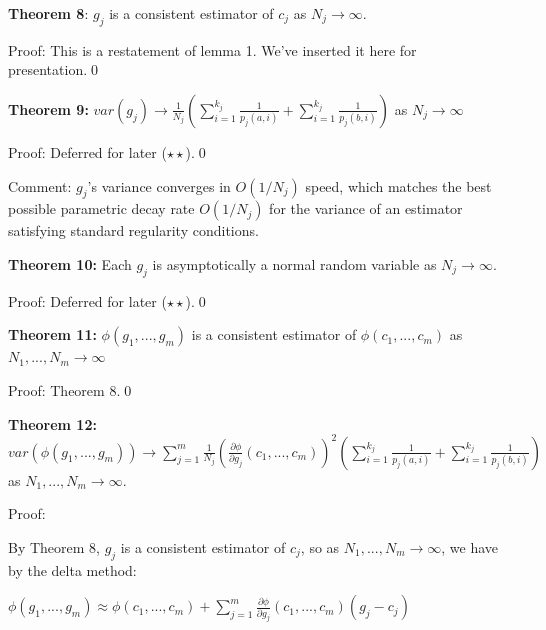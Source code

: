 \documentclass{article}
\begin{document}
\textbf{Theorem 8}: $\displaystyle g_{j}$ is a consistent estimator of $\displaystyle c_{j}$ as $\displaystyle N_{j}\rightarrow \infty $.

Proof: This is a restatement of lemma 1. We've inserted it here for presentation.\qed 



\textbf{Theorem 9:} $\displaystyle var\left( g_{j}\right)\rightarrow \frac{1}{N_{j}}\left(\sum _{i=1}^{k_{j}}\frac{1}{p_{j}\left( a,i\right)} +\sum _{i=1}^{k_{j}}\frac{1}{p_{j}\left( b,i\right)}\right)$ as $\displaystyle N_{j}\rightarrow \infty $

Proof: Deferred for later ($\displaystyle \star \star $).\qed 



Comment: $\displaystyle g_{j}$'s variance converges in $\displaystyle O\left( 1/N_{j}\right)$ speed, which matches the best possible parametric decay rate $\displaystyle O\left( 1/N_{j}\right)$ for the variance of an estimator satisfying standard regularity conditions.



\textbf{Theorem 10:} Each $\displaystyle g_{j}$ is asymptotically a normal random variable as $\displaystyle N_{j}\rightarrow \infty $.



Proof: Deferred for later ($\displaystyle \star \star $).\qed 



\textbf{Theorem 11:} $\displaystyle \phi \left( g_{1} ,...,g_{m}\right)$ is a consistent estimator of $\displaystyle \phi \left( c_{1} ,...,c_{m}\right)$ as $\displaystyle N_{1} ,...,N_{m}\rightarrow \infty $



Proof: Theorem 8.\qed 

\textbf{Theorem 12:} $\displaystyle var\left( \phi \left( g_{1} ,...,g_{m}\right)\right)\rightarrow \sum _{j=1}^{m}\frac{1}{N_{j}}\left(\frac{\partial \phi }{\partial g_{j}}\left( c_{1} ,...,c_{m}\right)\right)^{2}\left(\sum _{i=1}^{k_{j}}\frac{1}{p_{j}\left( a,i\right)} +\sum _{i=1}^{k_{j}}\frac{1}{p_{j}\left( b,i\right)}\right)$ as $\displaystyle N_{1} ,...,N_{m}\rightarrow \infty $.

Proof:

By Theorem 8, $\displaystyle g_{j}$ is a consistent estimator of $\displaystyle c_{j}$, so as $\displaystyle N_{1} ,...,N_{m}\rightarrow \infty $, we have by the delta method:

$\displaystyle \phi \left( g_{1} ,...,g_{m}\right) \approx \phi \left( c_{1} ,...,c_{m}\right) +\sum _{j=1}^{m}\frac{\partial \phi }{\partial g_{j}}\left( c_{1} ,...,c_{m}\right)\left( g_{j} -c_{j}\right)$ 
\end{document}
